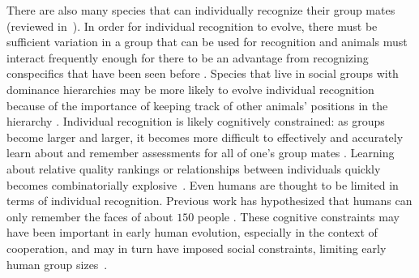 There are also many species that can individually recognize their group mates (reviewed in~\citep{Tibbetts2007IndividualDifferent,Wiley2013SpecificityBehaviour}). In order for individual recognition to evolve, there must be sufficient variation in a group that can be used for recognition and animals must interact frequently enough for there to be an advantage from recognizing conspecifics that have been seen before \citep{Whitfield:1987tg,Sheehan:2014fk}. Species that live in social groups with dominance hierarchies may be more likely to evolve individual recognition because of the importance of keeping track of other animals' positions in the hierarchy \citep{Whitfield:1987tg,Barnard:1979fk}. Individual recognition is likely cognitively constrained: as groups become larger and larger, it becomes more difficult to effectively and accurately learn about and remember assessments for all of one's group mates \citep{Rohwer:1982fk,Solberg:1997uq}. Learning about relative quality rankings or relationships between individuals quickly becomes combinatorially explosive~\citep{Seyfarth2015SocialCognition}. Even humans are thought to be limited in terms of individual recognition. Previous work has hypothesized that humans can only remember the faces of about $150$ people \citep{Dunbar:1993zr,Hill:2003ly}. These cognitive constraints may have been important in early human evolution, especially in the context of cooperation, and may in turn have imposed social constraints, limiting early human group sizes~\citep{Dunbar:1992ys,Dunbar:1993zr}.


